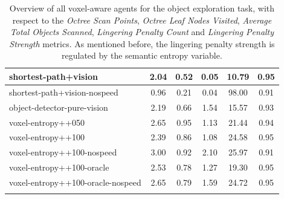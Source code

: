 \begin{table}
\begin{longtable}{|l|c|c|c|c|c|}
shortest-path+vision & {\cellcolor[HTML]{DCEBE8}} \color[HTML]{000000} 2.04 & {\cellcolor[HTML]{EBF2F0}} \color[HTML]{000000} 0.52 & {\cellcolor[HTML]{EBF2F0}} \color[HTML]{000000} 0.05 & 10.79 & 0.95 \\ \hline
shortest-path+vision-nospeed & {\cellcolor[HTML]{EBF2F0}} \color[HTML]{000000} 0.96 & {\cellcolor[HTML]{EBF2F0}} \color[HTML]{000000} 0.21 & {\cellcolor[HTML]{EBF2F0}} \color[HTML]{000000} 0.04 & 98.00 & 0.91 \\ \hline
object-detector-pure-vision & {\cellcolor[HTML]{DAEAE6}} \color[HTML]{000000} 2.19 & {\cellcolor[HTML]{EBF2F0}} \color[HTML]{000000} 0.66 & {\cellcolor[HTML]{A4D0C7}} \color[HTML]{000000} 1.54 & 15.57 & 0.93 \\ \hline
voxel-entropy++050 & {\cellcolor[HTML]{D4E7E3}} \color[HTML]{000000} 2.65 & {\cellcolor[HTML]{EBF2F0}} \color[HTML]{000000} 0.95 & {\cellcolor[HTML]{DEECE9}} \color[HTML]{000000} 1.13 & 21.44 & 0.94 \\ \hline
voxel-entropy++100 & {\cellcolor[HTML]{D7E9E5}} \color[HTML]{000000} 2.39 & {\cellcolor[HTML]{EBF2F0}} \color[HTML]{000000} 0.86 & {\cellcolor[HTML]{E5EFED}} \color[HTML]{000000} 1.08 & 24.58 & 0.95 \\ \hline
voxel-entropy++100-nospeed & {\cellcolor[HTML]{CEE4E0}} \color[HTML]{000000} 3.00 & {\cellcolor[HTML]{EBF2F0}} \color[HTML]{000000} 0.92 & {\cellcolor[HTML]{55AA99}} \color[HTML]{F1F1F1} 2.10 & 25.97 & 0.91 \\ \hline
voxel-entropy++100-oracle & {\cellcolor[HTML]{D5E8E4}} \color[HTML]{000000} 2.53 & {\cellcolor[HTML]{EBF2F0}} \color[HTML]{000000} 0.78 & {\cellcolor[HTML]{CBE3DD}} \color[HTML]{000000} 1.27 & 19.30 & 0.95 \\ \hline
voxel-entropy++100-oracle-nospeed & {\cellcolor[HTML]{D4E7E3}} \color[HTML]{000000} 2.65 & {\cellcolor[HTML]{EBF2F0}} \color[HTML]{000000} 0.79 & {\cellcolor[HTML]{9DCDC3}} \color[HTML]{000000} 1.59 & 24.72 & 0.95 \\ \hline
    
        \caption{
            Overview of all voxel-aware agents for the object exploration task, with respect to the \textit{Octree Scan Points}, \textit{Octree Leaf Nodes Visited}, \textit{Average Total Objects Scanned}, 
            \textit{Lingering Penalty Count} and \textit{Lingering Penalty Strength} metrics. As mentioned before, the lingering penalty strength is regulated by the semantic entropy variable.
        }
        \label{tab:results-RQ1-explorative-performance}
    \end{longtable}


\end{table}


